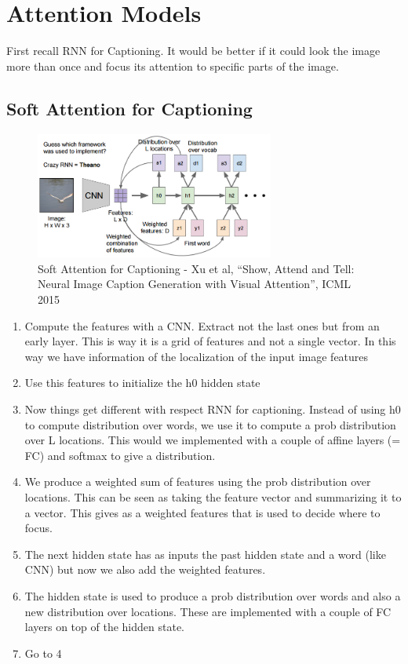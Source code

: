 \documentclass{article}
\begin{document}
	
	\section{Attention Models}
	First recall RNN for Captioning. It would be better if it could look the image more than once and focus its attention to specific parts of the image.
	
	\subsection{Soft Attention for Captioning}
	\begin{figure}[h]
		\centering
		\includegraphics[width=0.7\textwidth]{Images/attention_models/1.png}
		\caption{Soft Attention for Captioning - Xu et al, “Show, Attend and Tell: Neural Image Caption Generation with Visual Attention”, ICML 2015}
	\end{figure}
	
	\begin{enumerate}
		\item Compute the features with a CNN. Extract not the last ones but from an early layer. This is way it is a grid of features and not a single vector. In this way we have information of the localization of the input image features
		\item Use this features to initialize the h0 hidden state
		\item Now things get different with respect RNN for captioning. Instead of using h0 to compute distribution over words, we use it to compute a prob distribution over L locations. This would we implemented with a couple of affine layers (= FC) and softmax to give a distribution.
		\item We produce a weighted sum of features using the prob distribution over locations. This can be seen as taking the feature vector and summarizing it to a vector. This gives as a weighted features that is used to decide where to focus.
		\item The next hidden state has as inputs the past hidden state and a word (like CNN) but now we also add the weighted features.
		\item The hidden state is used to produce a prob distribution over words and also a new distribution over locations. These are implemented with a couple of FC layers on top of the hidden state.
		\item Go to 4
	\end{enumerate}
	
\end{document}
